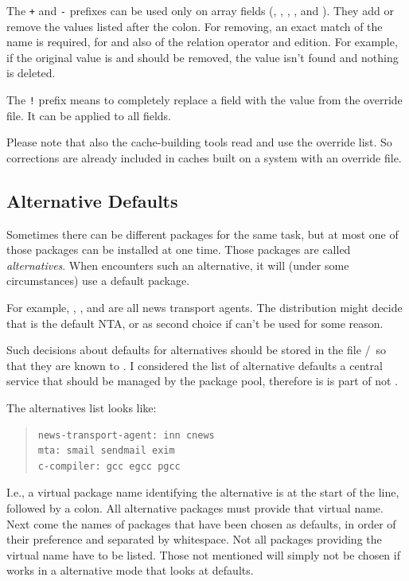 \documentclass[10pt]{article}
\begin{document}
The \texttt{+} and \texttt{-} prefixes can be used only on array
fields (, , ,
, and ). They add or remove the values
listed after the colon. For removing, an exact match of the name is
required, for  and  also of the relation
operator and edition. For example, if the original value is  and  should be removed, the value isn't found
and nothing is deleted.

The \texttt{!} prefix means to completely replace a field with the
value from the override file. It can be applied to all fields.

Please note that also the cache-building tools read and use the
override list. So corrections are already included in caches built on
a system with an override file.


\subsection{Alternative Defaults}
\label{pkgdb-alternatives}

Sometimes there can be different packages for the same task, but at
most one of those packages can be installed at one time. Those
packages are called {\em alternatives}. When 
encounters such an alternative, it will (under some circumstances) use
a default package.

For example, , , and  are all
news transport agents. The distribution might decide that 
is the default NTA, or as second choice  if 
can't be used for some reason.

Such decisions about defaults for alternatives should be stored in the
file \PKGDBULIBPATH\slash\ALTDEFAULTSFILENAME\ so that they are known
to . I considered the list of alternative defaults a
central service that should be managed by the package pool, therefore
is is part of  not .

The alternatives list looks like:
\begin{quote}
\begin{verbatim}
news-transport-agent: inn cnews
mta: smail sendmail exim
c-compiler: gcc egcc pgcc
\end{verbatim}
\end{quote}
I.e., a virtual package name identifying the alternative is at the
start of the line, followed by a colon. All alternative packages must
provide that virtual name. Next come the names of packages that have
been chosen as defaults, in order of their preference and separated
by whitespace. Not all packages providing the virtual name have to be
listed. Those not mentioned will simply not be chosen if
 works in a alternative mode that looks at defaults.
\end{document}

